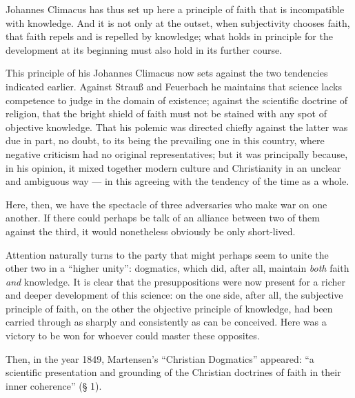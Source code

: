 \documentclass[12pt,a4paper]{book}
\newcommand{\opage}[1]{\marginnote{\footnotesize\textit{[#1]}}}
\begin{document}
Johannes Climacus has thus set up here a principle of faith that is incompatible with knowledge. And it is not only at the outset, when subjectivity chooses faith, that faith repels and is repelled by knowledge; what holds in principle for the development at its beginning must also hold in its further course.

This principle of his Johannes Climacus now sets against the two tendencies indicated earlier. Against Strauß and Feuerbach he maintains that science lacks competence to judge in the domain of existence; against the scientific doctrine of religion, that the bright shield of faith must not be stained with any spot of objective knowledge. That his polemic was directed chiefly against the latter was due in part, no doubt, to its being the prevailing one in this country, where negative criticism had no original representatives; but it was principally because, in his opinion, it mixed together modern culture and Christianity in an unclear and ambiguous way --- in this agreeing with the tendency of the time as a whole.

Here, then, we have the spectacle of three adversaries who make war on one another. If there could perhaps be talk of an alliance between two of them against the third, it would nonetheless obviously be only short-lived.

Attention naturally turns to the party that might perhaps seem to unite the other two in a ``higher unity'': dogmatics, which did, after all, maintain \emph{both} faith \emph{and} knowledge. It is clear that the presuppositions were now present for a
\opage{25}\setcounter{footnote}{0}%
richer and deeper development of this science: on the one side, after all, the subjective principle of faith, on the other the objective principle of knowledge, had been carried through as sharply and consistently as can be conceived. Here was a victory to be won for whoever could master these opposites.

Then, in the year 1849, Martensen's ``Christian Dogmatics'' appeared: ``a scientific presentation and grounding of the Christian doctrines of faith in their inner coherence'' (§ 1).
\end{document}
